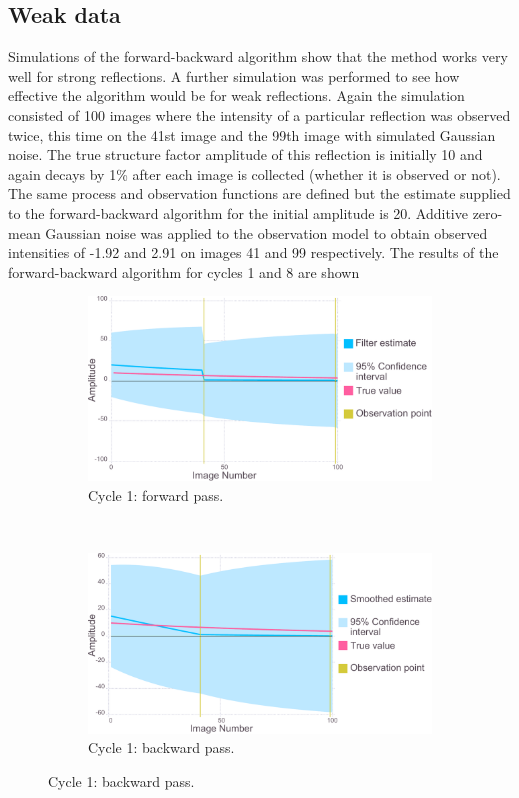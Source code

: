 \subsection{Weak data}
\label{sub:Weak Data}
Simulations of the forward-backward algorithm show that the method works very well for strong reflections.
A further simulation was performed to see how effective the algorithm would be for weak reflections.
Again the simulation consisted of 100 images where the intensity of a particular reflection was observed twice, this time on the 41st image and the 99th image with simulated Gaussian noise.
The true structure factor amplitude of this reflection is initially 10 and again decays by 1\% after each image is collected (whether it is observed or not).
The same process and observation functions are defined but the estimate supplied to the forward-backward algorithm for the initial amplitude is 20.
Additive zero-mean Gaussian noise was applied to the observation model to obtain observed intensities of -1.92 and 2.91 on images 41 and 99 respectively.
The results of the forward-backward algorithm for cycles 1 and 8 are shown
\begin{figure}
    \ContinuedFloat
    \begin{subfigure}[b]{1.0\textwidth}
        \centering
        \includegraphics[width=\textwidth]{figures/datared/intDecSim_Filt1_bad.pdf}
        \caption{Cycle 1: forward pass.}
        \label{fig:UKF simulation results - cycle 1 - bad}
    \end{subfigure}
    \\
    \begin{subfigure}[b]{1.0\textwidth}
        \centering
        \includegraphics[width=\textwidth]{figures/datared/intDecSim1_bad.pdf}
        \caption{Cycle 1: backward pass.}
        \label{fig:URTSS simulation results - cycle 1 - bad}
    \end{subfigure}
\end{figure}
